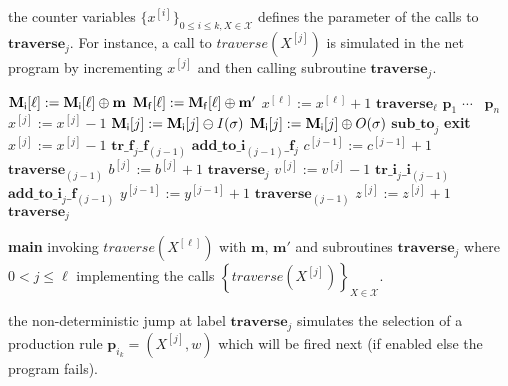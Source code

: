 \documentclass{fsttcs}
\def\set#1{{\left\{ #1 \right\}}}
\def\mmap{\mathbf{m}}
\begin{document}
\noindent \textbullet{} the counter variables \(\{x^{[i]}\}_{0\leq i\leq k, X\in\mathcal{X}}\) defines
		the parameter of the calls to \(\mathbf{traverse}_j\). For instance, a call
		to \(\mathit{traverse}(X^{[j]})\) is simulated in the net program by incrementing \(x^{[j]}\)
		and then calling subroutine \(\mathbf{traverse}_{j}\).


\noindent {}\begin{minipage}[t]{.44\linewidth}
	\vspace{0pt}
	{\footnotesize
\begin{algorithm}[H]
\(\mathbf{M}_{\sf i}[\ell]:=\mathbf{M}_{\sf i}[\ell]\oplus\mmap\)\;
      \(\mathbf{M}_{\sf f}[\ell]:=\mathbf{M}_{\sf f}[\ell]\oplus\mmap'\)\;
			\(x^{[\ell]}:=x^{[\ell]}+1\)\;
			\gosub \(\mathbf{traverse}_\ell\)\;
 \goto \(\mathbf{p}_1\) \Kor \(\cdots\) \Kor\ \goto \(\mathbf{p}_n\)\;
[\ldots]\;
  \(x^{[j]}:=x^{[j]}-1\)\;
      \(\mathbf{M}_{\sf i}[j]:=\mathbf{M}_{\sf i}[j]\ominus I(\sigma)\)\;
      \(\mathbf{M}_{\sf i}[j]:=\mathbf{M}_{\sf i}[j]\oplus O(\sigma)\)\;
\gosub \(\mathbf{sub\_to}_{j}\)\;
			\goto \textbf{exit}\;
			[\ldots]\;
  \(x^{[j]}:=x^{[j]}-1\)\;
			\gosub \(\mathbf{tr\_f}_{j}\mathbf{\_f}_{(j-1)}\)\;
			\gosub \(\mathbf{add\_to\_i}_{(j-1)}\_\mathbf{f}_{j}\)\;
      \(c^{[j-1]}:=c^{[j-1]}+1\)\;
			\gosub \(\mathbf{traverse}_{(j-1)}\)\;
			  \(b^{[j]}:=b^{[j]}+1\)\;
			\goto \(\mathbf{traverse}_j\)\;
			[\ldots]\;
 \(v^{[j]}:=v^{[j]}-1\)\;
			\gosub \(\mathbf{tr\_i}_{j}\mathbf{\_i}_{(j-1)}\)\;
			\gosub \(\mathbf{add\_to\_i}_{j}\_\mathbf{f}_{(j-1)}\)\;
			\(y^{[j-1]}:=y^{[j-1]}+1\)\;
			\gosub \(\mathbf{traverse}_{(j-1)}\)\;
			  \(z^{[j]}:=z^{[j]}+1\)\;
			\goto \(\mathbf{traverse}_j\)\;
			[\ldots]\;
			 \Return{}\;
			[\ldots]\;
			 \halt\;
\caption{ \footnotesize \textbf{main} invoking \(\mathit{traverse}(X^{[\ell]})\) with \(\mmap\),
\(\mmap'\) and subroutines \(\mathbf{traverse}_j\) where \(0<
j\leq\ell\) implementing the calls \(\set{\mathit{traverse}(X^{[j]})}_{X\in\mathcal{X}}\).\label{alg:np}}
\end{algorithm}}
\end{minipage}\begin{minipage}[t]{.50\linewidth}
	\noindent \textbullet{} the non-deterministic jump at label \(\mathbf{traverse}_{j}\) simulates
		the selection of a production rule \(\mathbf{p}_{i_k}=(X^{[j]},w)\) which will be fired next
		(if enabled else the program fails). 


\end{minipage}
\end{document}
